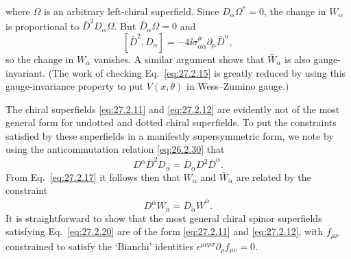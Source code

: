 where \(\Omega\) is an arbitrary left-chiral superfield. Since
\(D_\alpha\Omega^*=0\), the change in \(W_\alpha\) is proportional to
\(\bar D^2D_\alpha\Omega\). But \(\bar D_{\dot\alpha}\Omega=0\) and
\[
  [\bar D^2,D_\alpha]
  =-4\ii\sigma^\mu_{\alpha\dot\alpha}
    \partial_\mu\bar D^{\dot\alpha},
\]
so the change in \(W_\alpha\) vanishes. A similar argument shows that
\(\bar W_{\dot\alpha}\) is also gauge-invariant. (The work of checking
Eq.~\eqref{eq:27.2.15} is greatly reduced by using this gauge-invariance
property to put \(V(x,\theta)\) in Wess--Zumino gauge.)

The chiral superfields \eqref{eq:27.2.11} and \eqref{eq:27.2.12} are
evidently not of the most general form for undotted and dotted chiral
superfields. To put the constraints satisfied by these superfields in a
manifestly supersymmetric form, we note by using the anticommutation
relation \eqref{eq:26.2.30} that
\begin{equation}
  D^\alpha\bar D^2D_\alpha
  =\bar D_{\dot\alpha}D^2\bar D^{\dot\alpha}.
  \tag{27.2.19}\label{eq:27.2.19}
\end{equation}
From Eq.~\eqref{eq:27.2.17} it follows then that \(W_\alpha\) and
\(\bar W_{\dot\alpha}\) are
related by the constraint
\begin{equation}
  D^\alpha W_\alpha
  =\bar D_{\dot\alpha}\bar W^{\dot\alpha}.
  \tag{27.2.20}\label{eq:27.2.20}
\end{equation}
It is straightforward to show that the most general chiral spinor
superfields satisfying Eq.~\eqref{eq:27.2.20} are of the form
\eqref{eq:27.2.11} and \eqref{eq:27.2.12}, with \(f_{\mu\nu}\) constrained
to satisfy the `Bianchi' identities
\(\epsilon^{\mu\nu\rho\sigma}\partial_\rho f_{\mu\nu}=0\).
